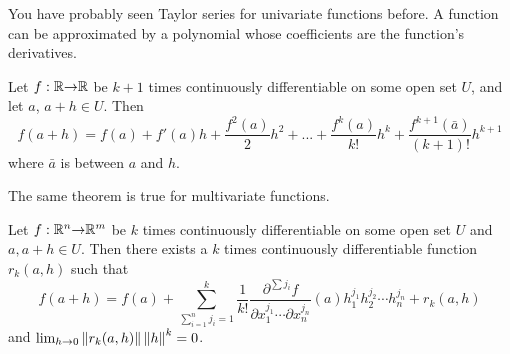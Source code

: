 You have probably seen Taylor series for univariate functions
before. A function can be approximated by a polynomial whose
coefficients are the function's derivatives. 
\begin{theorem}
  Let $f: \mathbb{R} {\rightarrow} \mathbb{R}$ be $k+1$ times continuously differentiable on some
  open set $U$, and let $a$, $a+h \in U$. Then 
  \[ f(a+h) = f(a) + f'(a) h + \frac{f^2(a)}{2} h^2 + ... +
  \frac{f^k(a)}{k!} h^k + \frac{f^{k+1}(\bar{a})}{(k+1)!} h^{k+1}
  \]
  where $\bar{a}$ is between $a$ and $h$. 
\end{theorem}
The same theorem is true for multivariate functions.
\begin{theorem}
  Let $f:\mathbb{R}^n {\rightarrow} \mathbb{R}^m$ be $k$ times continuously differentiable on
  some open set $U$ and $a, a+h \in U$. Then there exists a $k$ times
  continuously differentiable function $r_k(a,h)$ such that
  \[ f(a+h) = f(a) + \sum_{\sum_{i=1}^n {j_i}=1}^k\frac{1}{k!}
  \frac{\partial^{\sum j_i} f}{\partial x_{1}^{j_1} \cdots \partial
    x_{n}^{j_n}}(a) h_1^{j_1}h_2^{j_2} \cdots h_n^{j_n} + r_k(a,h) \]
  and $\lim_{h {\rightarrow} 0} \left\Vert {r_k(a,h)} \right\Vert{\left\Vert {h} \right\Vert^k} = 0$.
\end{theorem}
